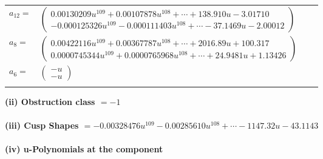 \documentclass[1p]{elsarticle_modified}
\theoremstyle{definition}
\begin{document}
\begin{tabular}{m{7pt} m{180pt} m{7pt} m{180pt} }
\flushright $a_{12}=$&$\begin{pmatrix}0.00130209 u^{109}+0.00107878 u^{108}+\cdots+138.910 u-3.01710\\-0.000125326 u^{109}-0.000111403 u^{108}+\cdots-37.1469 u-2.00012\end{pmatrix}$ \\
\flushright $a_{8}=$&$\begin{pmatrix}0.00422116 u^{109}+0.00367787 u^{108}+\cdots+2016.89 u+100.317\\0.0000745344 u^{109}+0.0000765968 u^{108}+\cdots+24.9481 u+1.13426\end{pmatrix}$ \\
\flushright $a_{6}=$&$\begin{pmatrix}- u\\- u\end{pmatrix}$\\&\end{tabular}
\flushleft \textbf{(ii) Obstruction class $= -1$}\\~\\
\flushleft \textbf{(iii) Cusp Shapes $= -0.00328476 u^{109}-0.00285610 u^{108}+\cdots-1147.32 u-43.1143$}\\~\\
\newpage\renewcommand{\arraystretch}{1}
\flushleft \textbf{(iv) u-Polynomials at the component}\newline \\
\end{document}
